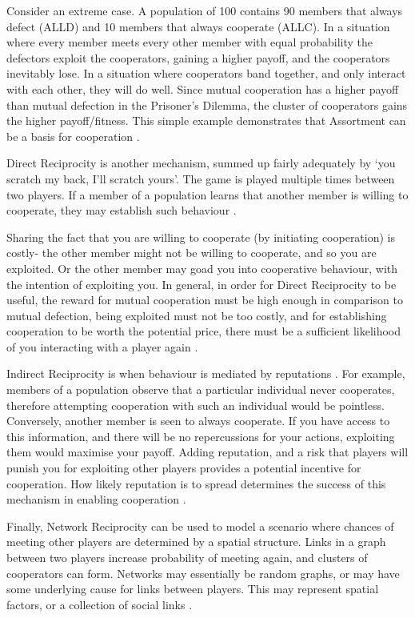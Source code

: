 \documentclass[a4paper,11pt]{article}
\begin{document}
Consider an extreme case. A population of 100 contains 90 members that always defect (ALLD) and 10 members that always cooperate (ALLC). 
In a situation where every member meets every other member with equal probability the defectors exploit the cooperators, gaining a higher payoff, and the cooperators inevitably lose. 
In a situation where cooperators band together, and only interact with each other, they will do well. 
Since mutual cooperation has a higher payoff than mutual defection in the Prisoner's Dilemma, the cluster of cooperators gains the higher payoff/fitness. 
This simple example demonstrates that Assortment can be a basis for cooperation \citep{bergstrom2003algebra, eshel:PNAS:1982}. 

Direct Reciprocity is another mechanism, summed up fairly adequately by `you scratch my back, I'll scratch yours'. The game is played multiple times between two players. If a member of a population learns that another member is willing to cooperate, they may establish such behaviour \citep{fogel1993evolving}. 

Sharing the fact that you are willing to cooperate (by initiating cooperation) is costly- the other member might not be willing to cooperate, and so you are exploited. Or the other member may goad you into cooperative behaviour, with the intention of exploiting you. 
In general, in order for Direct Reciprocity to be useful, the reward for mutual cooperation must be high enough in comparison to mutual defection, being exploited must not be too costly, and for establishing cooperation to be worth the potential price, there must be a sufficient likelihood of you interacting with a player again \citep{Axelrod1984}. 

Indirect Reciprocity is when behaviour is mediated by reputations \citep{Axelrod1997}. 
For example, members of a population observe that a particular individual never cooperates, therefore attempting cooperation with such an individual would be pointless. 
Conversely, another member is seen to always cooperate. 
If you have access to this information, and there will be no repercussions for your actions, exploiting them would maximise your payoff. 
Adding reputation, and a risk that players will punish you for exploiting other players provides a potential incentive for cooperation. How likely reputation is to spread determines the success of this mechanism in enabling cooperation \citep{nowak1998dynamics}.

Finally, Network Reciprocity can be used to model a scenario where chances of meeting other players are determined by a spatial structure. 
Links in a graph between two players increase probability of meeting again, and clusters of cooperators can form. 
Networks may essentially be random graphs, or may have some underlying cause for links between players. 
This may represent spatial factors, or a collection of social links \citep{ohtsuki2006simple}.
\end{document}
